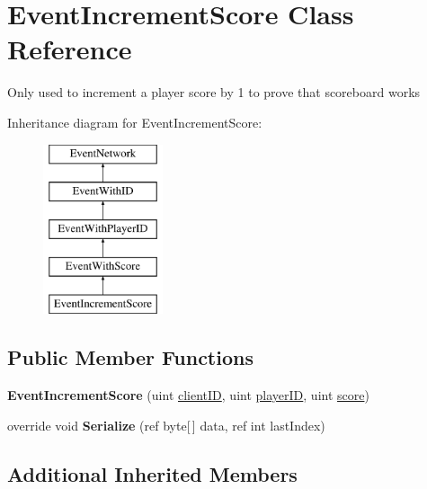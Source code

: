 \hypertarget{class_event_increment_score}{\section{Event\-Increment\-Score Class Reference}
\label{class_event_increment_score}
}


Only used to increment a player score by 1 to prove that scoreboard works  


Inheritance diagram for Event\-Increment\-Score\-:\begin{figure}[H]
\begin{center}
\leavevmode
\includegraphics[height=5.000000cm]{class_event_increment_score}
\end{center}
\end{figure}
\subsection*{Public Member Functions}
\begin{DoxyCompactItemize}
\item 
\hypertarget{class_event_increment_score_a0133296840a0225da8d18e71a092c841}{{\bfseries Event\-Increment\-Score} (uint \hyperlink{class_event_with_i_d_a4b58cdaef622cb06405b6829a160cef5}{client\-I\-D}, uint \hyperlink{class_event_with_player_i_d_a41340c3a625e17bb56c31cc937db338e}{player\-I\-D}, uint \hyperlink{class_event_with_score_a521dbdffa1ed1b2a08a671d881f66062}{score})}\label{class_event_increment_score_a0133296840a0225da8d18e71a092c841}

\item 
\hypertarget{class_event_increment_score_ae79e2912d979a306a9cbdffc88fa9227}{override void {\bfseries Serialize} (ref byte\mbox{[}$\,$\mbox{]} data, ref int last\-Index)}\label{class_event_increment_score_ae79e2912d979a306a9cbdffc88fa9227}

\end{DoxyCompactItemize}
\subsection*{Additional Inherited Members}



